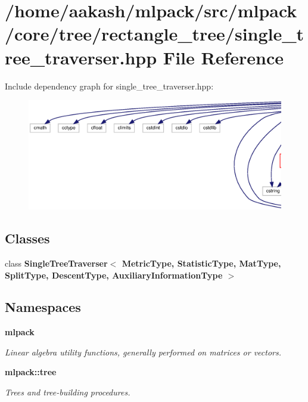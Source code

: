 \section{/home/aakash/mlpack/src/mlpack/core/tree/rectangle\+\_\+tree/single\+\_\+tree\+\_\+traverser.hpp File Reference}
\label{rectangle__tree_2single__tree__traverser_8hpp}
Include dependency graph for single\+\_\+tree\+\_\+traverser.\+hpp\+:
\nopagebreak
\begin{figure}[H]
\begin{center}
\leavevmode
\includegraphics[width=350pt]{rectangle__tree_2single__tree__traverser_8hpp__incl}
\end{center}
\end{figure}
\subsection*{Classes}
\begin{DoxyCompactItemize}
\item 
class \textbf{ Single\+Tree\+Traverser$<$ Metric\+Type, Statistic\+Type, Mat\+Type, Split\+Type, Descent\+Type, Auxiliary\+Information\+Type $>$}
\end{DoxyCompactItemize}
\subsection*{Namespaces}
\begin{DoxyCompactItemize}
\item 
 \textbf{ mlpack}
\begin{DoxyCompactList}\small\item\em Linear algebra utility functions, generally performed on matrices or vectors. \end{DoxyCompactList}\item 
 \textbf{ mlpack\+::tree}
\begin{DoxyCompactList}\small\item\em Trees and tree-\/building procedures. \end{DoxyCompactList}\end{DoxyCompactItemize}


